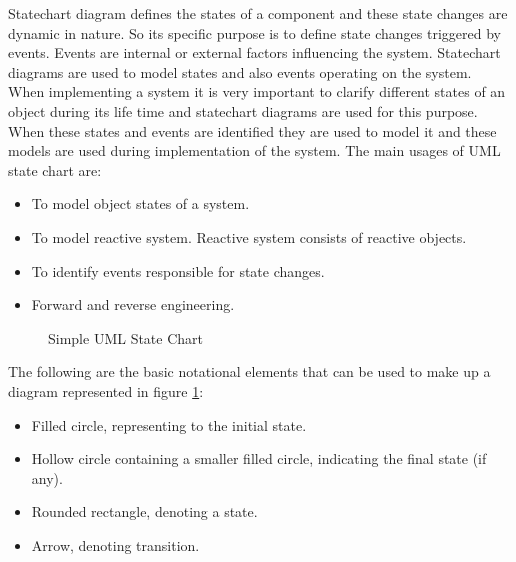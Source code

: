 Statechart diagram defines the states of a component and these state changes are dynamic in nature. So its specific purpose is to define state changes triggered by events. Events are internal or external factors influencing the system. Statechart diagrams are used to model states and also events operating on the system. When implementing a system it is very important to clarify different states of an object during its life time and statechart diagrams are used for this purpose. When these states and events are identified they are used to model it and these models are used during implementation of the system. The main usages of UML state chart are:
\begin{itemize}
	\item To model object states of a system.
	\item To model reactive system. Reactive system consists of reactive objects.
	\item To identify events responsible for state changes.
	\item Forward and reverse engineering.
\end{itemize}

\begin{figure}[htbp]
	\centering
	\label{simple_stateChart}
	\caption{Simple UML State Chart}
\end{figure}

The following are the basic notational elements that can be used to make up a diagram represented in figure \ref{simple_stateChart}:
\begin{itemize}
	\item Filled circle, representing to the initial state.	
	\item Hollow circle containing a smaller filled circle, indicating the final state (if any).	
	\item Rounded rectangle, denoting a state.	
	\item Arrow, denoting transition.	
\end{itemize}

